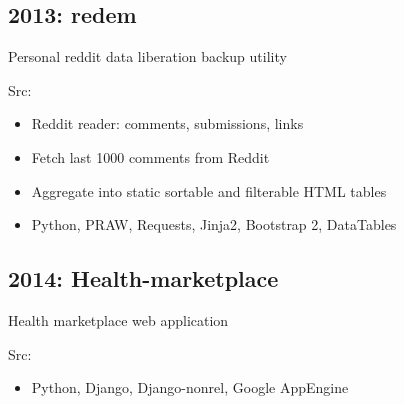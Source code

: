 \documentclass[letter,,openany,oneside,english]{sphinxhowto}
\begin{document}
\subsection{2013: redem}
\label{\detokenize{resume:redem}}
\begin{DUlineblock}{0em}
\item[] Personal reddit data liberation backup utility
\item[] Src: 
\end{DUlineblock}
\begin{itemize}
\item {} 
Reddit reader: comments, submissions, links

\item {} 
Fetch last 1000 comments from Reddit

\item {} 
Aggregate into static sortable and filterable HTML tables

\item {} 
Python, PRAW, Requests, Jinja2, Bootstrap 2, DataTables

\end{itemize}

\begin{DUlineblock}{0em}
\item[] 
\end{DUlineblock}


\subsection{2014: Health-marketplace}
\label{\detokenize{resume:health-marketplace}}
\begin{DUlineblock}{0em}
\item[] Health marketplace web application
\item[] Src: 
\end{DUlineblock}
\begin{itemize}
\item {} 
Python, Django, Django-nonrel, Google AppEngine

\end{itemize}
\end{document}
